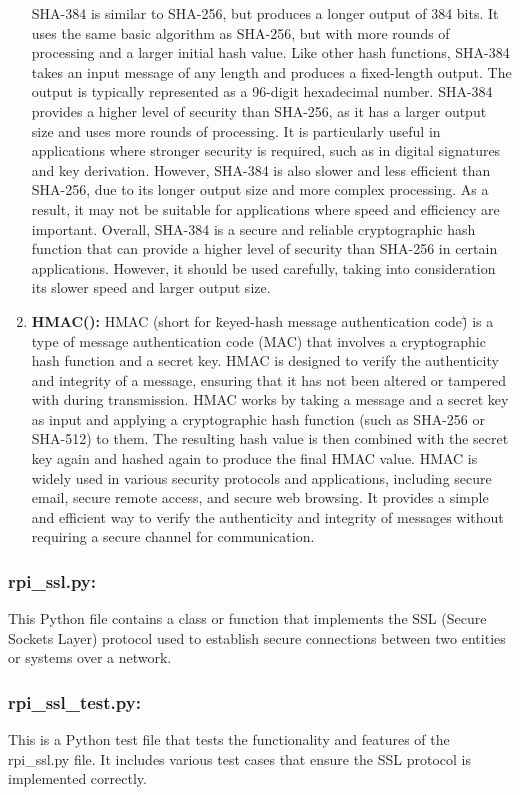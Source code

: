 \documentclass{article}
\begin{document}
\begin{enumerate}
SHA-384 is similar to SHA-256, but produces a longer output of 384 bits.
It uses the same basic algorithm as SHA-256, but with more rounds of processing and a larger initial hash value.
Like other hash functions, SHA-384 takes an input message of any length and produces a fixed-length output.
The output is typically represented as a 96-digit hexadecimal number.
SHA-384 provides a higher level of security than SHA-256, as it has a larger output size and uses more rounds of processing.
It is particularly useful in applications where stronger security is required, such as in digital signatures and key derivation.
However, SHA-384 is also slower and less efficient than SHA-256, due to its longer output size and more complex processing.
As a result, it may not be suitable for applications where speed and efficiency are important.
Overall, SHA-384 is a secure and reliable cryptographic hash function that can provide a higher level of security than SHA-256 in certain applications.
However, it should be used carefully, taking into consideration its slower speed and larger output size.
    \item \textbf{HMAC():}
    HMAC (short for \"keyed-hash message authentication code\") is a type of message authentication code (MAC) that involves a cryptographic hash function and a secret key.
    HMAC is designed to verify the authenticity and integrity of a message, ensuring that it has not been altered or tampered with during transmission.
HMAC works by taking a message and a secret key as input and applying a cryptographic hash function (such as SHA-256 or SHA-512) to them.
The resulting hash value is then combined with the secret key again and hashed again to produce the final HMAC value.
HMAC is widely used in various security protocols and applications, including secure email, secure remote access, and secure web browsing.
It provides a simple and efficient way to verify the authenticity and integrity of messages without requiring a secure channel for communication.
\end{enumerate}


\subsubsection{rpi\_ssl.py:} This Python file contains a class or function that implements the SSL (Secure Sockets Layer) protocol used to establish secure connections between two entities or systems over a network.

\subsubsection{rpi\_ssl\_test.py:} This is a Python test file that tests the functionality and features of the rpi\_ssl.py file.
It includes various test cases that ensure the SSL protocol is implemented correctly.
\end{document}
